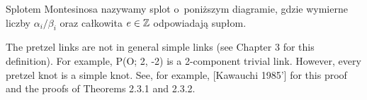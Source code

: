 \begin{definition}
    Splotem Montesinosa nazywamy splot o~poniższym diagramie, gdzie wymierne liczby $\alpha_i/\beta_i$ oraz całkowita $e \in \mathbb Z$ odpowiadają supłom.
\begin{comment}
    \[
    \begin{tikzpicture}[baseline=-0.65ex, scale=0.1]
        \draw[semithick] (-5, 5) rectangle (5, 15);
        \foreach \x in {0,1,3,4} {
            \draw[semithick] (15*\x-35, -15) rectangle (15*\x-25, -5);
        }
        \foreach \x in {0,1,2,3,4,5} {
            \draw[semithick] (15*\x-35, -8) to (15*\x-40, -8);
            \draw[semithick] (15*\x-35, -12) to (15*\x-40, -12);
        }
        \draw[semithick] (-40, -8) [in=down, out=left] to (-45, -3);
        \draw[semithick] (-40, -12) [in=down, out=left] to (-49, -3);

        \draw[semithick] (-40, 8) [in=up, out=left] to (-45, 3);
        \draw[semithick] (-40, 12) [in=up, out=left] to (-49, 3);

        \draw[semithick] (40, 8) [in=up, out=right] to (45, 3);
        \draw[semithick] (40, 12) [in=up, out=right] to (49, 3);

        \draw[semithick] (40, -8) [in=down, out=right] to (45, -3);
        \draw[semithick] (40, -12) [in=down, out=right] to (49, -3);

        \draw[semithick] (-45, -3)  to (-45, 3);
        \draw[semithick] (-49, -3)  to (-49, 3);
        \draw[semithick] (45, -3)  to (45, 3);
        \draw[semithick] (49, -3)  to (49, 3);

        \draw[semithick] (-5, 8)  to (-40, 8);
        \draw[semithick] ( 5, 8)  to ( 40, 8);
        \draw[semithick] (-5, 12)  to (-40, 12);
        \draw[semithick] ( 5, 12)  to ( 40, 12);

        \node at (0, 10) {e};
        \node at (0, -10) {\ldots};
        \node at (-15, -10) {$\displaystyle \frac{\alpha_2}{\beta_2}$};
        \node at (-30, -10) {$\displaystyle \frac{\alpha_1}{\beta_1}$};
        \node at (15, -10) {$\displaystyle \frac{\alpha_{n-1}}{\beta_{n-1}}$};
        \node at (30, -10) {$\displaystyle \frac{\alpha_n}{\beta_n}$};
    \end{tikzpicture}
    \]
\end{comment}
\end{definition}

\begin{tobedone}
The pretzel links are not in general simple links (see Chapter 3 for this definition). For example, P(O; 2, -2) is a 2-component trivial link. However, every pretzel knot is a simple knot. See, for example, [Kawauchi 1985'] for this proof and the proofs of Theorems 2.3.1 and 2.3.2.
\end{tobedone}


